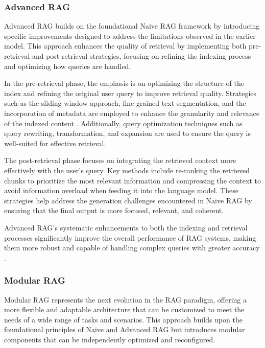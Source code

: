 \subsubsection{Advanced RAG}

Advanced RAG builds on the foundational Naive RAG framework by introducing specific improvements designed to address the limitations observed in the earlier model. This approach enhances the quality of retrieval by implementing both pre-retrieval and post-retrieval strategies, focusing on refining the indexing process and optimizing how queries are handled.

In the pre-retrieval phase, the emphasis is on optimizing the structure of the index and refining the original user query to improve retrieval quality. Strategies such as the sliding window approach, fine-grained text segmentation, and the incorporation of metadata are employed to enhance the granularity and relevance of the indexed content \cite{ilin2023advancedrag}. Additionally, query optimization techniques such as query rewriting, transformation, and expansion are used to ensure the query is well-suited for effective retrieval.

The post-retrieval phase focuses on integrating the retrieved context more effectively with the user’s query. Key methods include re-ranking the retrieved chunks to prioritize the most relevant information and compressing the context to avoid information overload when feeding it into the language model. These strategies help address the generation challenges encountered in Naive RAG by ensuring that the final output is more focused, relevant, and coherent.

Advanced RAG’s systematic enhancements to both the indexing and retrieval processes significantly improve the overall performance of RAG systems, making them more robust and capable of handling complex queries with greater accuracy \cite{gao2023retrieval}.

\subsubsection{Modular RAG}

Modular RAG represents the next evolution in the RAG paradigm, offering a more flexible and adaptable architecture that can be customized to meet the needs of a wide range of tasks and scenarios. This approach builds upon the foundational principles of Naive and Advanced RAG but introduces modular components that can be independently optimized and reconfigured.

